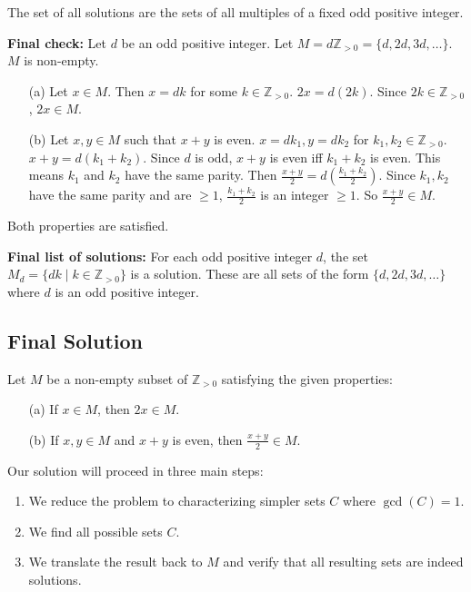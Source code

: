 \documentclass[12pt,a4paper]{article}
\theoremstyle{definition}
\begin{document}
    The set of all solutions are the sets of all multiples of a fixed odd positive integer.

    \textbf{Final check:}
    Let $d$ be an odd positive integer. Let $M=d\mathbb{Z}_{>0}=\{d, 2d, 3d, \ldots \}$.
    $M$ is non-empty.
    \begin{enumerate}
        \item[(a)] Let $x \in M$. Then $x=dk$ for some $k \in \mathbb{Z}_{>0}$. $2x=d(2k)$. Since $2k \in \mathbb{Z}_{>0}$, $2x \in M$.
        \item[(b)] Let $x,y \in M$ such that $x+y$ is even. $x=dk_1, y=dk_2$ for $k_1,k_2 \in \mathbb{Z}_{>0}$.
        $x+y=d(k_1+k_2)$. Since $d$ is odd, $x+y$ is even iff $k_1+k_2$ is even. This means $k_1$ and $k_2$ have the same parity.
        Then $\frac{x+y}{2} = d\left(\frac{k_1+k_2}{2}\right)$. Since $k_1,k_2$ have the same parity and are $\geq 1$, $\frac{k_1+k_2}{2}$ is an integer $\geq 1$.
        So $\frac{x+y}{2} \in M$.
    \end{enumerate}
    Both properties are satisfied.

    \textbf{Final list of solutions:}
    For each odd positive integer $d$, the set $M_d = \{dk \mid k \in \mathbb{Z}_{>0}\}$ is a solution.
    These are all sets of the form $\{d, 2d, 3d, \ldots\}$ where $d$ is an odd positive integer.

\subsection{Final Solution}
        Let $M$ be a non-empty subset of $\mathbb{Z}_{>0}$ satisfying the given properties:
        \begin{enumerate}
            \item[(a)] If $x \in M$, then $2x \in M$.
            \item[(b)] If $x, y \in M$ and $x + y$ is even, then $\frac{x + y}{2} \in M$.
        \end{enumerate}

        Our solution will proceed in three main steps:
        \begin{enumerate}
            \item We reduce the problem to characterizing simpler sets $C$ where $\gcd(C)=1$.
            \item We find all possible sets $C$.
            \item We translate the result back to $M$ and verify that all resulting sets are indeed solutions.
        \end{enumerate}
\end{document}
